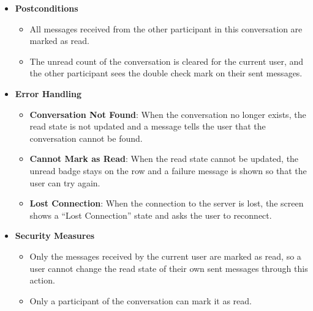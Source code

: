 \begin{itemize}[leftmargin=1.6em,topsep=4pt,itemsep=3pt,parsep=0pt,label=$\bullet$]
        \begin{itemize}[leftmargin=2.2em,topsep=2pt,itemsep=3pt,parsep=0pt,label=$\circ$]
            \item \textbf{Nothing to Read}: When the conversation has no unread message, the ``Mark as read'' action is disabled in the menu.
            \item \textbf{New Message While Reading}: When a new message arrives while the thread is open, that message is marked as read immediately.
        \end{itemize}
    \item \textbf{Postconditions}

        \begin{itemize}[leftmargin=2.2em,topsep=2pt,itemsep=3pt,parsep=0pt,label=$\circ$]
            \item All messages received from the other participant in this conversation are marked as read.
            \item The unread count of the conversation is cleared for the current user, and the other participant sees the double check mark on their sent messages.
        \end{itemize}
    \item \textbf{Error Handling}

        \begin{itemize}[leftmargin=2.2em,topsep=2pt,itemsep=3pt,parsep=0pt,label=$\circ$]
            \item \textbf{Conversation Not Found}: When the conversation no longer exists, the read state is not updated and a message tells the user that the conversation cannot be found.
            \item \textbf{Cannot Mark as Read}: When the read state cannot be updated, the unread badge stays on the row and a failure message is shown so that the user can try again.
            \item \textbf{Lost Connection}: When the connection to the server is lost, the screen shows a ``Lost Connection'' state and asks the user to reconnect.
        \end{itemize}
    \item \textbf{Security Measures}

        \begin{itemize}[leftmargin=2.2em,topsep=2pt,itemsep=3pt,parsep=0pt,label=$\circ$]
            \item Only the messages received by the current user are marked as read, so a user cannot change the read state of their own sent messages through this action.
            \item Only a participant of the conversation can mark it as read.
        \end{itemize}
\end{itemize}

